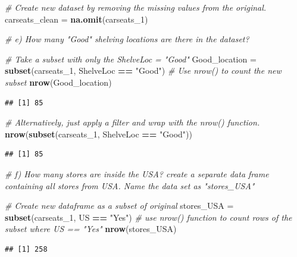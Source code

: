 \documentclass[
]{article}
\newenvironment{Shaded}{\begin{snugshade}}{\end{snugshade}}
\newcommand{\CommentTok}[1]{\textcolor[rgb]{0.56,0.35,0.01}{\textit{#1}}}
\newcommand{\FunctionTok}[1]{\textcolor[rgb]{0.13,0.29,0.53}{\textbf{#1}}}
\newcommand{\NormalTok}[1]{#1}
\newcommand{\OtherTok}[1]{\textcolor[rgb]{0.56,0.35,0.01}{#1}}
\newcommand{\SpecialCharTok}[1]{\textcolor[rgb]{0.81,0.36,0.00}{\textbf{#1}}}
\newcommand{\StringTok}[1]{\textcolor[rgb]{0.31,0.60,0.02}{#1}}
\begin{document}
\begin{Shaded}
\begin{Highlighting}[]
    \CommentTok{\# Create new dataset by removing the missing values from the original.}
\NormalTok{  carseats\_clean }\OtherTok{=} \FunctionTok{na.omit}\NormalTok{(carseats\_1)}


\CommentTok{\# e)  How many "Good" shelving locations are there in the dataset?}
    
    \CommentTok{\# Take a subset with only the ShelveLoc = "Good"}
\NormalTok{  Good\_location }\OtherTok{=} \FunctionTok{subset}\NormalTok{(carseats\_1, ShelveLoc }\SpecialCharTok{==} \StringTok{"Good"}\NormalTok{)}
    \CommentTok{\# Use nrow() to count the new subset}
  \FunctionTok{nrow}\NormalTok{(Good\_location)}
\end{Highlighting}
\end{Shaded}

\begin{verbatim}
## [1] 85
\end{verbatim}

\begin{Shaded}
\begin{Highlighting}[]
    \CommentTok{\# Alternatively, just apply a filter and wrap with the nrow() function.}
  \FunctionTok{nrow}\NormalTok{(}\FunctionTok{subset}\NormalTok{(carseats\_1, ShelveLoc }\SpecialCharTok{==} \StringTok{"Good"}\NormalTok{))}
\end{Highlighting}
\end{Shaded}

\begin{verbatim}
## [1] 85
\end{verbatim}

\begin{Shaded}
\begin{Highlighting}[]
\CommentTok{\# f)  How many stores are inside the USA? create a separate data frame containing all stores from USA. Name the data set as "stores\_USA"}

    \CommentTok{\# Create new dataframe as a subset of original}
\NormalTok{  stores\_USA }\OtherTok{=} \FunctionTok{subset}\NormalTok{(carseats\_1, US }\SpecialCharTok{==} \StringTok{"Yes"}\NormalTok{)}
    \CommentTok{\# use nrow() function to count rows of the subset where US == "Yes"}
  \FunctionTok{nrow}\NormalTok{(stores\_USA)}
\end{Highlighting}
\end{Shaded}

\begin{verbatim}
## [1] 258
\end{verbatim}
\end{document}
